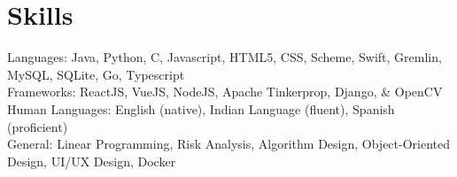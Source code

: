 \documentclass{article}
\begin{document}
	\section{Skills}
	Languages:
	Java, Python, C, Javascript, HTML5, CSS, Scheme, Swift, Gremlin, MySQL, SQLite, Go, Typescript \\
	Frameworks:
	ReactJS, VueJS, NodeJS, Apache Tinkerprop, Django,  \& OpenCV \\
	Human Languages:
	English (native), Indian Language (fluent), Spanish (proficient) \\
	General:
	Linear Programming, Risk Analysis, Algorithm Design, Object-Oriented Design, UI/UX Design, Docker
	
	
\end{document}
